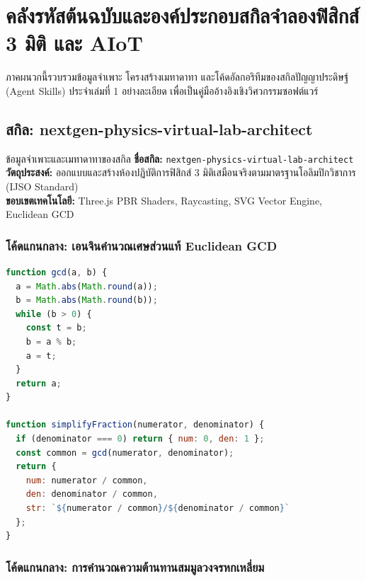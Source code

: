 \chapter{คลังรหัสต้นฉบับและองค์ประกอบสกิลจำลองฟิสิกส์ 3 มิติ และ AIoT}

ภาคผนวกนี้รวบรวมข้อมูลจำเพาะ โครงสร้างเมทาดาทา และโค้ดอัลกอริทึมของสกิลปัญญาประดิษฐ์ (Agent Skills) ประจำเล่มที่ 1 อย่างละเอียด เพื่อเป็นคู่มืออ้างอิงเชิงวิศวกรรมซอฟต์แวร์

\section{สกิล: nextgen-physics-virtual-lab-architect}

\begin{teachingplan}{ข้อมูลจำเพาะและเมทาดาทาของสกิล}
\textbf{ชื่อสกิล:} \texttt{nextgen-physics-virtual-lab-architect}\\
\textbf{วัตถุประสงค์:} ออกแบบและสร้างห้องปฏิบัติการฟิสิกส์ 3 มิติเสมือนจริงตามมาตรฐานโอลิมปิกวิชาการ (IJSO Standard)\\
\textbf{ขอบเขตเทคโนโลยี:} Three.js PBR Shaders, Raycasting, SVG Vector Engine, Euclidean GCD
\end{teachingplan}

\subsection{โค้ดแกนกลาง: เอนจินคำนวณเศษส่วนแท้ Euclidean GCD}

\begin{lstlisting}[language=JavaScript, caption={Euclidean GCD Engine สำหรับรักษาความแม่นยำทางฟิสิกส์}]
function gcd(a, b) {
  a = Math.abs(Math.round(a));
  b = Math.abs(Math.round(b));
  while (b > 0) {
    const t = b;
    b = a % b;
    a = t;
  }
  return a;
}

function simplifyFraction(numerator, denominator) {
  if (denominator === 0) return { num: 0, den: 1 };
  const common = gcd(numerator, denominator);
  return {
    num: numerator / common,
    den: denominator / common,
    str: `${numerator / common}/${denominator / common}`
  };
}
\end{lstlisting}

\subsection{โค้ดแกนกลาง: การคำนวณความต้านทานสมมูลวงจรหกเหลี่ยม}

